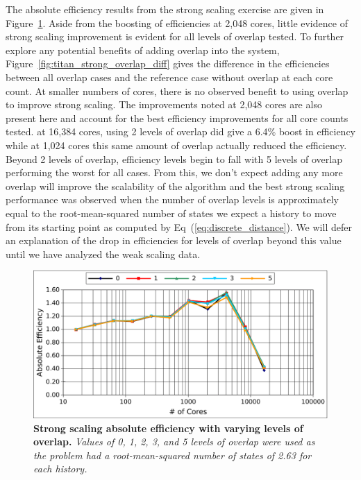 The absolute efficiency results from the strong scaling exercise are
given in Figure~\ref{fig:titan_strong_overlap}. Aside from the
boosting of efficiencies at 2,048 cores, little evidence of strong
scaling improvement is evident for all levels of overlap tested. To
further explore any potential benefits of adding overlap into the
system, Figure~\ref{fig:titan_strong_overlap_diff} gives the
difference in the efficiencies between all overlap cases and the
reference case without overlap at each core count. At smaller numbers
of cores, there is no observed benefit to using overlap to improve
strong scaling. The improvements noted at 2,048 cores are also present
here and account for the best efficiency improvements for all core
counts tested. at 16,384 cores, using 2 levels of overlap did give a
6.4\% boost in efficiency while at 1,024 cores this same amount of
overlap actually reduced the efficiency. Beyond 2 levels of overlap,
efficiency levels begin to fall with 5 levels of overlap performing
the worst for all cases. From this, we don't expect adding any more
overlap will improve the scalability of the algorithm and the best
strong scaling performance was observed when the number of overlap
levels is approximately equal to the root-mean-squared number of
states we expect a history to move from its starting point as computed
by Eq~(\ref{eq:discrete_distance}). We will defer an explanation of
the drop in efficiencies for levels of overlap beyond this value until
we have analyzed the weak scaling data.

\begin{figure}[t!]
  \begin{center}
    \includegraphics[width=6in]{chapters/parallel_mc/titan_strong_overlap.pdf}
  \end{center}
  \caption{\textbf{Strong scaling absolute efficiency with varying
      levels of overlap.} \textit{Values of 0, 1, 2, 3, and 5 levels
      of overlap were used as the problem had a root-mean-squared
      number of states of 2.63 for each history.}}
  \label{fig:titan_strong_overlap}
\end{figure}

